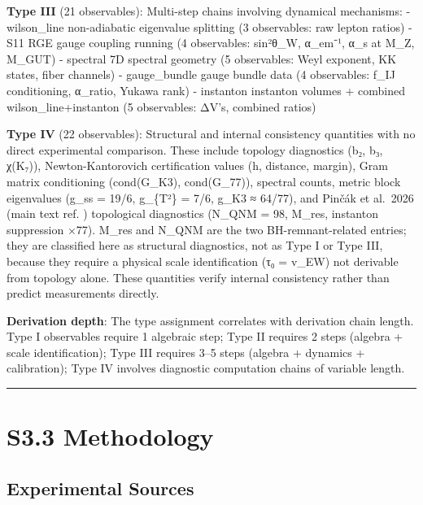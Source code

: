 \documentclass[11pt,a4paper]{article}
\begin{document}
\textbf{Type III} (21 observables): Multi-step chains involving dynamical mechanisms: - wilson\_\allowbreak{}line non-adiabatic eigenvalue splitting (3 observables: raw lepton ratios) - S11 RGE gauge coupling running (4 observables: sin²θ\_\allowbreak{}W, α\_\allowbreak{}em⁻¹, α\_\allowbreak{}s at M\_\allowbreak{}Z, M\_\allowbreak{}GUT) - spectral 7D spectral geometry (5 observables: Weyl exponent, KK states, fiber channels) - gauge\_\allowbreak{}bundle gauge bundle data (4 observables: f\_\allowbreak{}IJ conditioning, α\_\allowbreak{}ratio, Yukawa rank) - instanton instanton volumes + combined wilson\_\allowbreak{}line+instanton (5 observables: ΔV's, combined ratios)

\textbf{Type IV} (22 observables): Structural and internal consistency quantities with no direct experimental comparison. These include topology diagnostics (b₂, b₃, χ(K₇)), Newton-Kantorovich certification values (h, distance, margin), Gram matrix conditioning (cond(G\_\allowbreak{}K3), cond(G\_\allowbreak{}77)), spectral counts, metric block eigenvalues (g\_\allowbreak{}ss = 19/6, g\_\allowbreak{}\{T²\} = 7/6, g\_\allowbreak{}K3 ≈ 64/77), and Pinčák et al.~2026 (main text ref. \cite{42}) topological diagnostics (N\_\allowbreak{}QNM = 98, M\_\allowbreak{}res, instanton suppression ×77). M\_\allowbreak{}res and N\_\allowbreak{}QNM are the two BH-remnant-related entries; they are classified here as structural diagnostics, not as Type I or Type III, because they require a physical scale identification (τ₀ = v\_\allowbreak{}EW) not derivable from topology alone. These quantities verify internal consistency rather than predict measurements directly.

\textbf{Derivation depth}: The type assignment correlates with derivation chain length. Type I observables require 1 algebraic step; Type II requires 2 steps (algebra + scale identification); Type III requires 3--5 steps (algebra + dynamics + calibration); Type IV involves diagnostic computation chains of variable length.

\begin{center}\rule{\linewidth}{0.5pt}\end{center}

\section{S3.3 Methodology}\label{s3.3-methodology}

\subsection{Experimental Sources}\label{experimental-sources}
\end{document}
